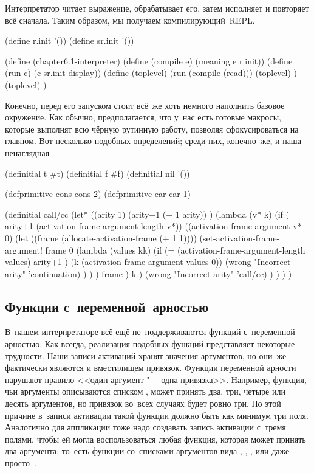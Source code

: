 Интерпретатор читает выражение, обрабатывает его, затем исполняет и повторяет
всё сначала. Таким образом, мы получаем компилирующий~REPL.

\begin{code:lisp}
(define  r.init '())
(define sr.init '())

(define (chapter6.1-interpreter)
  (define (compile e) (meaning e r.init))
  (define (run c) (c sr.init display))
  (define (toplevel)
    (run (compile (read)))
    (toplevel) )
  (toplevel) )
\end{code:lisp}

Конечно, перед его запуском стоит всё~же хоть немного наполнить базовое
окружение. Как обычно, предполагается, что у~нас есть готовые макросы,
которые выполнят всю чёрную рутинную работу, позволяя сфокусироваться на
главном. Вот несколько подобных определений; среди них, конечно~же, и наша
ненаглядная .

\begin{code:lisp}
(definitial t #t)
(definitial f #f)
(definitial nil '())

(defprimitive cons cons 2)
(defprimitive car car 1)

(definitial call/cc
  (let* ((arity 1)
         (arity+1 (+ 1 arity)) )
    (lambda (v* k)
      (if (= arity+1 (activation-frame-argument-length v*))
          ((activation-frame-argument v* 0)
           (let ((frame (allocate-activation-frame (+ 1 1))))
             (set-activation-frame-argument!
              frame 0
              (lambda (values kk)
                (if (= (activation-frame-argument-length values)
                       arity+1 )
                    (k (activation-frame-argument values 0))
                    (wrong "Incorrect arity" 'continuation) ) ) )
             frame )
           k )
          (wrong "Incorrect arity" 'call/cc) ) ) ) )
\end{code:lisp}


\subsection{Функции с~переменной~арностью}\label{fast/fast/ssest:varargs}

В~нашем интерпретаторе всё ещё не~поддерживаются функций с~переменной арностью.
Как всегда, реализация подобных функций представляет некоторые трудности. Наши
записи активаций хранят значения аргументов, но они~же фактически являются и
вместилищем привязок. Функции переменной арности нарушают правило <<один
аргумент "--- одна привязка>>. Например, функция, чьи аргументы описываются
списком , может принять два, три, четыре или десять аргументов, но
привязок во~всех случаях будет ровно три. По этой причине в~записи активации
такой функции должно быть как минимум три поля. Аналогично для аппликации
 тоже надо создавать запись активации с~тремя полями,
чтобы ей могла воспользоваться любая функция, которая может принять два
аргумента: то~есть функции со~списками аргументов вида , , , или даже просто~.

